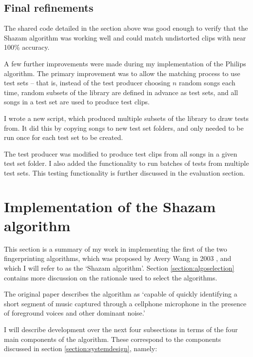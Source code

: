 \documentclass[12pt,a4paper,twoside,openright]{report}
\begin{document}
\subsection{Final refinements}

The shared code detailed in the section above was good enough to verify that the Shazam algorithm was working well and could match undistorted clips with near 100\% accuracy.

A few further improvements were made during my implementation of the Philips algorithm. The primary improvement was to allow the matching process to use test sets -- that is, instead of the test producer choosing $n$ random songs each time, random subsets of the library are defined in advance as test sets, and all songs in a test set are used to produce test clips.

I wrote a new script, which produced multiple subsets of the library to draw tests from. It did this by copying songs to new test set folders, and only needed to be run once for each test set to be created. 

The test producer was modified to produce test clips from all songs in a given test set folder. I also added the functionality to run batches of tests from multiple test sets. This testing functionality is further discussed in the evaluation section. %



\section{Implementation of the Shazam algorithm}
\label{section:shazam}

This section is a summary of my work in implementing the first of the two fingerprinting algorithms, which was proposed by Avery Wang in 2003 \cite{Wang03}, and which I will refer to as the `Shazam algorithm'. Section \ref{section:algoselection} contains more discussion on the rationale used to select the algorithms.

The original paper describes the algorithm as `capable of quickly identifying a short segment of music captured through a cellphone microphone in the presence of foreground voices and other dominant noise.' %

I will describe development over the next four subsections in terms of the four main components of the algorithm. These correspond to the components discussed in section \ref{section:systemdesign}, namely: 
\end{document}
